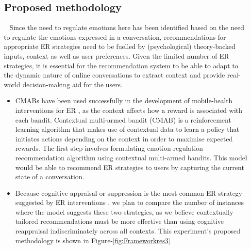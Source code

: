 \subsection{Proposed methodology}~\label{subsec:RQs}
Since the need to regulate emotions here has been identified based on the need to regulate the emotions expressed in a conversation, recommendations for appropriate ER strategies need to be fuelled by (psychological) theory-backed inputs, context as well as user preferences. Given the limited number of ER strategies, it is essential for the recommendation system to be able to adapt to the dynamic nature of online conversations to extract context and provide real-world decision-making aid for the users.
\begin{itemize}
    \item CMABs have been used successfully in the development of mobile-health interventions for ER \cite{beltzer2022building}, \cite{ameko2020offline} as the context affects how a reward is associated with each bandit. Contextual multi-armed bandit (CMAB) is a reinforcement learning algorithm that makes use of contextual data to learn a policy that initiates actions depending on the context in order to maximise expected rewards. The first step involves formulating emotion regulation recommendation algorithm using contextual multi-armed bandits. This model would be able to recommend ER strategies to users by capturing the current state of a conversation.
    \item Because cognitive appraisal or suppression is the most common ER strategy suggested by ER interventions \cite{aldao2010emotion}, we plan to compare the number of instances where the model suggests these two strategies, as we believe contextually tailored recommendations must be more effective than using cognitive reappraisal indiscriminately across all contexts. This experiment's proposed methodology is shown in Figure-\ref{fig:Frameworkres3}
\end{itemize}